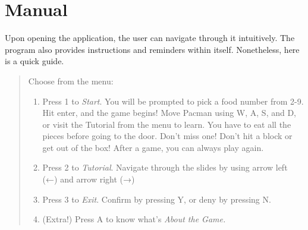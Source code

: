 \section{Manual}
Upon opening the application, the user can navigate through it intuitively. The program also provides instructions and reminders within itself. Nonetheless, here is a quick guide.

\begin{quote}
    Choose from the menu:
        \begin{enumerate}
            \item Press 1 to \emph{Start}. You will be prompted to pick a food number from 2-9. Hit enter, and the game begins! Move Pacman using W, A, S, and D, or visit the Tutorial from the menu to learn. You have to eat all the pieces before going to the door. Don’t miss one! Don’t hit a block or get out of the box! After a game, you can always play again.
            \item Press 2 to \emph{Tutorial}. Navigate through the slides by using arrow left (←) and arrow right (→)
            \item Press 3 to \emph{Exit}. Confirm by pressing Y, or deny by pressing N.
            \item (Extra!) Press A to know what's \emph{About the Game.}
        \end{enumerate}
\end{quote}